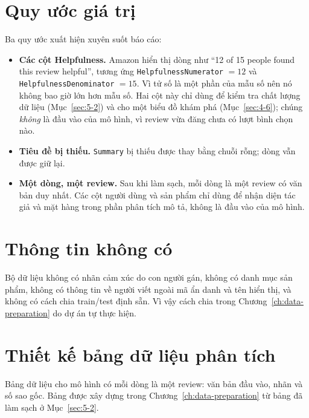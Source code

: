 \section{Quy ước giá trị}
\label{sec:3-5}

Ba quy ước xuất hiện xuyên suốt báo cáo:

\begin{itemize}
    \item \textbf{Các cột Helpfulness.} Amazon hiển thị dòng như ``12 of 15 people found this review helpful'', tương ứng \texttt{HelpfulnessNumerator} $=12$ và \texttt{HelpfulnessDenominator} $=15$. Vì tử số là một phần của mẫu số nên nó không bao giờ lớn hơn mẫu số. Hai cột này chỉ dùng để kiểm tra chất lượng dữ liệu (Mục~\ref{sec:5-2}) và cho một biểu đồ khám phá (Mục~\ref{sec:4-6}); chúng \emph{không} là đầu vào của mô hình, vì review vừa đăng chưa có lượt bình chọn nào.
    \item \textbf{Tiêu đề bị thiếu.} \texttt{Summary} bị thiếu được thay bằng chuỗi rỗng; dòng vẫn được giữ lại.
    \item \textbf{Một dòng, một review.} Sau khi làm sạch, mỗi dòng là một review có văn bản duy nhất. Các cột người dùng và sản phẩm chỉ dùng để nhận diện tác giả và mặt hàng trong phần phân tích mô tả, không là đầu vào của mô hình.
\end{itemize}

\section{Thông tin không có}
\label{sec:3-6}

Bộ dữ liệu không có nhãn cảm xúc do con người gán, không có danh mục sản phẩm, không có thông tin về người viết ngoài mã ẩn danh và tên hiển thị, và không có cách chia train/test định sẵn. Vì vậy cách chia trong Chương~\ref{ch:data-preparation} do dự án tự thực hiện.

\section{Thiết kế bảng dữ liệu phân tích}
\label{sec:3-7}

Bảng dữ liệu cho mô hình có mỗi dòng là một review: văn bản đầu vào, nhãn và số sao gốc. Bảng được xây dựng trong Chương~\ref{ch:data-preparation} từ bảng đã làm sạch ở Mục~\ref{sec:5-2}.
